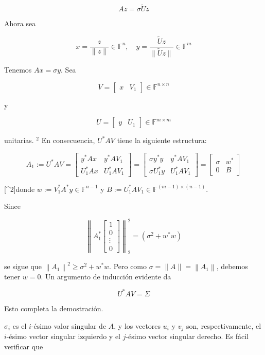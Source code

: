 \documentclass[11pt]{article}
\begin{document}
$$
A z=\sigma \tilde{U} z
$$

Ahora sea

$$
x=\frac{z}{\|z\|} \in \mathbb{F}^{n}, \quad y=\frac{\tilde{U} z}{\|\tilde{U} z\|} \in \mathbb{F}^{m}
$$

Tenemos $A x=\sigma y$. Sea

$$
V=\left[\begin{array}{ll}
x & V_{1}
\end{array}\right] \in \mathbb{F}^{n \times n}
$$

y

$$
U=\left[\begin{array}{ll}
y & U_{1}
\end{array}\right] \in \mathbb{F}^{m \times m}
$$

unitarias. ${ }^{2}$ En consecuencia, $U^{*} A V$ tiene la siguiente estructura:

$$
A_{1}:=U^{*} A V=\left[\begin{array}{cc}
y^{*} A x & y^{*} A V_{1} \\
U_{1}^{*} A x & U_{1}^{*} A V_{1}
\end{array}\right]=\left[\begin{array}{cc}
\sigma y^{*} y & y^{*} A V_{1} \\
\sigma U_{1}^{*} y & U_{1}^{*} A V_{1}
\end{array}\right]=\left[\begin{array}{cc}
\sigma & w^{*} \\
0 & B
\end{array}\right]
$$

[\^{}2]donde $w:=V_{1}^{*} A^{*} y \in \mathbb{F}^{n-1}$ y $B:=U_{1}^{*} A V_{1} \in \mathbb{F}^{(m-1) \times(n-1)}$.

Since

$$
\left\|A_{1}^{*}\left[\begin{array}{c}
1 \\
0 \\
\vdots \\
0
\end{array}\right]\right\|_{2}^{2}=\left(\sigma^{2}+w^{*} w\right)
$$

se sigue que $\left\|A_{1}\right\|^{2} \geq \sigma^{2}+w^{*} w$. Pero como $\sigma=\|A\|=\left\|A_{1}\right\|$, debemos tener $w=0$. Un argumento de inducción evidente da

$$
U^{*} A V=\Sigma
$$

Esto completa la demostración.

$\sigma_{i}$ es el $i$-ésimo valor singular de $A$, y los vectores $u_{i}$ y $v_{j}$ son, respectivamente, el $i$-ésimo vector singular izquierdo y el $j$-ésimo vector singular derecho. Es fácil verificar que
\end{document}
